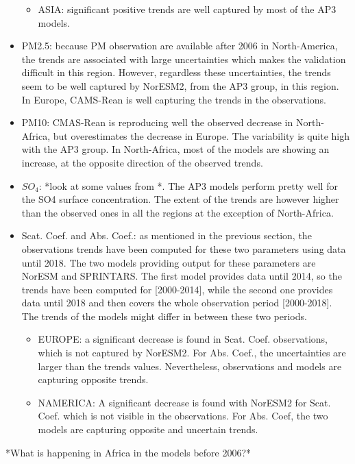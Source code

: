 \documentclass[journal abbreviation, manuscript]{copernicus}
\begin{document}
\begin{itemize}
\begin{itemize}
        \item ASIA: significant positive trends are well captured by most of the AP3 models.
       \end{itemize}
 \item PM2.5: because PM observation are available after 2006 in North-America, the trends are associated with large uncertainties which makes the validation difficult in this region. However, regardless these uncertainties, the trends seem to be well captured by NorESM2, from the AP3 group, in this region. In Europe, CAMS-Rean is well capturing the trends in the observations.
 \item PM10: CMAS-Rean is reproducing well the observed decrease in North-Africa, but overestimates the decrease in Europe. The variability is quite high with the AP3 group. In North-Africa, most of the models are showing an increase, at the opposite direction of the observed trends.
 \item $SO_{4}$: *look at some values from \cite{aas2019global}*. The AP3 models perform pretty well for the SO4 surface concentration. The extent of the trends are however higher than the observed ones in all the regions at the exception of North-Africa.
 \item Scat. Coef. and Abs. Coef.: as mentioned in the previous section, the observations trends have been computed for these two parameters using data until 2018. The two models providing output for these parameters are NorESM and SPRINTARS. The first model provides data until 2014, so the trends have been computed for [2000-2014], while the second one provides data until 2018 and then covers the whole observation period [2000-2018]. The trends of the models might differ in between these two periods.
       \begin{itemize}
        \item EUROPE: a significant decrease is found in Scat. Coef. observations, which is not captured by NorESM2. For Abs. Coef., the uncertainties are larger than the trends values. Nevertheless, observations and models are capturing opposite trends.
        \item NAMERICA: A significant decrease is found with NorESM2 for Scat. Coef. which is not visible in the observations. For Abs. Coef, the two models are capturing opposite and uncertain trends.
       \end{itemize}
\end{itemize}

*What is happening in Africa in the models before 2006?*
\end{document}
